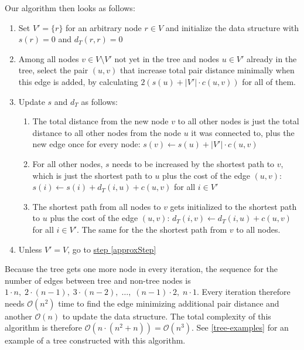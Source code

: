 \documentclass[a4paper, oneside]{discothesis}
\begin{document}
Our algorithm then looks as follows:
\begin{enumerate}
\item Set $V'=\{r\}$ for an arbitrary node $r\in V$ and initialize the data structure with $s(r)=0$ and $d_T(r,r)=0$
\item Among all nodes $v\in V\setminus V'$ not yet in the tree and nodes $u\in V'$ already in the tree, select the pair $(u,v)$ that increase total pair distance minimally when this edge is added, by calculating $2\left(s(u)+|V'|\cdot c(u,v)\right)$ for all of them.
\label{approxStep}
\item Update $s$ and $d_T$ as follows:
  \begin{enumerate}
  \item The total distance from the new node $v$ to all other nodes is just the total distance to all other nodes from the node $u$ it was connected to, plus the new edge once for every node: $s(v)\gets s(u)+|V'|\cdot c(u,v)$
  \item For all other nodes, $s$ needs to be increased by the shortest path to $v$, which is just the shortest path to $u$ plus the cost of the edge $(u,v)$: $s(i)\gets s(i)+d_T(i,u)+c(u,v)$ for all $i\in V'$
  \item The shortest path from all nodes to $v$ gets initialized to the shortest path to $u$ plus the cost of the edge $(u,v)$: $d_T(i,v)\gets d_T(i,u)+c(u,v)$ for all $i\in V'$. The same for the the shortest path from $v$ to all nodes.
  \end{enumerate}
\item Unless $V'=V$, go to \hyperref[approxStep]{step \ref{approxStep}}
\end{enumerate}

Because the tree gets one more node in every iteration, the sequence for the number of edges between tree and non-tree nodes is $1\cdot n,\;2\cdot(n-1),\;3\cdot(n-2),\;\dots,\;(n-1)\cdot2,\;n\cdot1$. Every iteration therefore needs $\mathcal{O}(n^2)$ time to find the edge minimizing additional pair distance and another $\mathcal{O}(n)$ to update the data structure. The total complexity of this algorithm is therefore $\mathcal{O}(n\cdot(n^2+n))=\mathcal{O}(n^3)$. See \autoref{tree-examples} for an example of a tree constructed with this algorithm.
\end{document}

